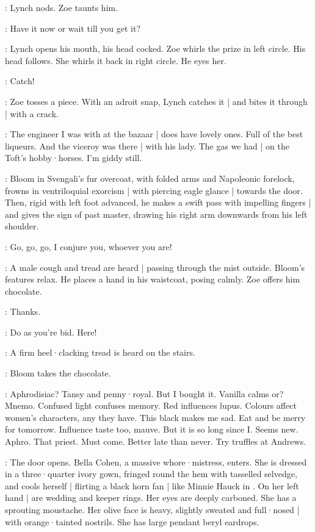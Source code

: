 :
Lynch nods.
Zoe taunts him.

\Zoe:
Have it now or wait till you get it?

:
Lynch opens his mouth,
his head cocked.
Zoe whirls the prize in left circle.
His head follows.
She whirls it back in right circle.
He eyes her.

\Zoe:
Catch!

:
Zoe tosses a piece.
With an adroit snap,
Lynch catches it |
and bites it through |
with a crack.

\Kitty:
The engineer I was with at the bazaar |
does have lovely ones.
Full of the best liqueurs.
And the viceroy was there |
with his lady.
The gas we had |
on the Toft's hobby·horses.
I'm giddy still.

:
Bloom in Svengali's fur overcoat,
with folded arms and Napoleonic forelock,
frowns in ventriloquial exorcism |
with piercing eagle glance |
towards the door.
Then,
rigid with left foot advanced,
he makes a swift pass with impelling fingers |
and gives the sign of past master,
drawing his right arm downwards from his left shoulder.

\Bloom:
Go,
go,
go,
I conjure you,
whoever you are!

:
A male cough and tread are heard |
passing through the mist outside.
Bloom's features relax.
He places a hand in his waistcoat,
posing calmly.
Zoe offers him chocolate.

\Bloom:
Thanks.

\Zoe:
Do as you're bid.
Here!

:
A firm heel·clacking tread is heard on the stairs.

:
Bloom takes the chocolate.

\Bloom:
Aphrodisiac?
Tansy and penny·royal.
But I bought it.
Vanilla calms or?
Mnemo.
Confused light confuses memory.
Red influences lupus.
Colours affect women's characters,
any they have.
This black makes me sad.
Eat and be merry for tomorrow.
Influence taste too,
mauve.
But it is so long since I\@.
Seems new.
Aphro.
That priest.
%
Must come.
Better late than never.
Try truffles at Andrews.

:
The door opens.
Bella Cohen,
a massive whore·mistress,
enters.
She is dressed in a three·quarter ivory gown,
fringed round the hem with tasselled selvedge,
and cools herself |
flirting a black horn fan |
like Minnie Hauck in .
On her left hand |
are wedding and keeper rings.
Her eyes are deeply carboned.
She has a sprouting moustache.
Her olive face is heavy,
slightly sweated and full·nosed |
with orange·tainted nostrils.
She has large pendant beryl eardrops.

